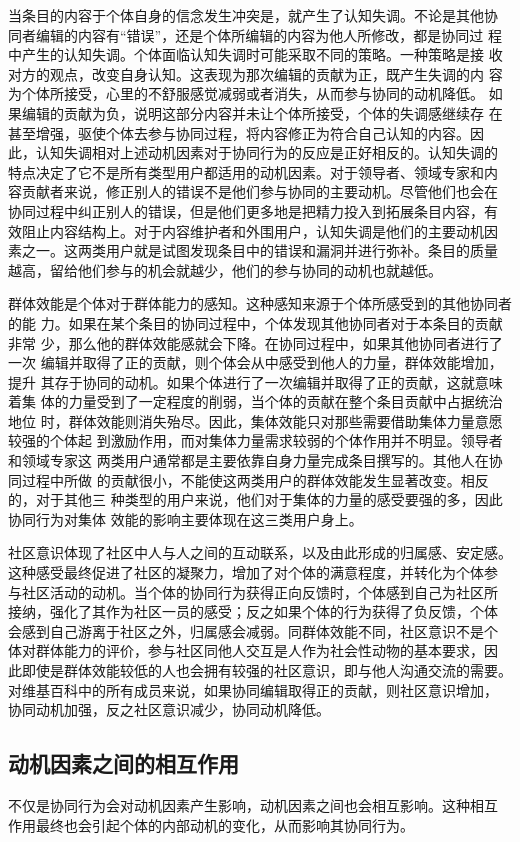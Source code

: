 当条目的内容于个体自身的信念发生冲突是，就产生了认知失调。不论是其他协
同者编辑的内容有“错误”，还是个体所编辑的内容为他人所修改，都是协同过
程中产生的认知失调。个体面临认知失调时可能采取不同的策略。一种策略是接
收对方的观点，改变自身认知。这表现为那次编辑的贡献为正，既产生失调的内
容为个体所接受，心里的不舒服感觉减弱或者消失，从而参与协同的动机降低。
如果编辑的贡献为负，说明这部分内容并未让个体所接受，个体的失调感继续存
在甚至增强，驱使个体去参与协同过程，将内容修正为符合自己认知的内容。因
此，认知失调相对上述动机因素对于协同行为的反应是正好相反的。认知失调的
特点决定了它不是所有类型用户都适用的动机因素。对于领导者、领域专家和内
容贡献者来说，修正别人的错误不是他们参与协同的主要动机。尽管他们也会在
协同过程中纠正别人的错误，但是他们更多地是把精力投入到拓展条目内容，有
效阻止内容结构上。对于内容维护者和外围用户，认知失调是他们的主要动机因
素之一。这两类用户就是试图发现条目中的错误和漏洞并进行弥补。条目的质量
越高，留给他们参与的机会就越少，他们的参与协同的动机也就越低。

群体效能是个体对于群体能力的感知。这种感知来源于个体所感受到的其他协同者的能
力。如果在某个条目的协同过程中，个体发现其他协同者对于本条目的贡献非常
少，那么他的群体效能感就会下降。在协同过程中，如果其他协同者进行了一次
编辑并取得了正的贡献，则个体会从中感受到他人的力量，群体效能增加，提升
其存于协同的动机。如果个体进行了一次编辑并取得了正的贡献，这就意味着集
体的力量受到了一定程度的削弱，当个体的贡献在整个条目贡献中占据统治地位
时，群体效能则消失殆尽。因此，集体效能只对那些需要借助集体力量意愿较强的个体起
到激励作用，而对集体力量需求较弱的个体作用并不明显。领导者和领域专家这
两类用户通常都是主要依靠自身力量完成条目撰写的。其他人在协同过程中所做
的贡献很小，不能使这两类用户的群体效能发生显著改变。相反的，对于其他三
种类型的用户来说，他们对于集体的力量的感受要强的多，因此协同行为对集体
效能的影响主要体现在这三类用户身上。

社区意识体现了社区中人与人之间的互动联系，以及由此形成的归属感、安定感。
这种感受最终促进了社区的凝聚力，增加了对个体的满意程度，并转化为个体参
与社区活动的动机。当个体的协同行为获得正向反馈时，个体感到自己为社区所
接纳，强化了其作为社区一员的感受；反之如果个体的行为获得了负反馈，个体
会感到自己游离于社区之外，归属感会减弱。同群体效能不同，社区意识不是个
体对群体能力的评价，参与社区同他人交互是人作为社会性动物的基本要求，因
此即使是群体效能较低的人也会拥有较强的社区意识，即与他人沟通交流的需要。
对维基百科中的所有成员来说，如果协同编辑取得正的贡献，则社区意识增加，
协同动机加强，反之社区意识减少，协同动机降低。


\subsection{动机因素之间的相互作用}
\label{sec:interaction}
不仅是协同行为会对动机因素产生影响，动机因素之间也会相互影响。这种相互
作用最终也会引起个体的内部动机的变化，从而影响其协同行为。

